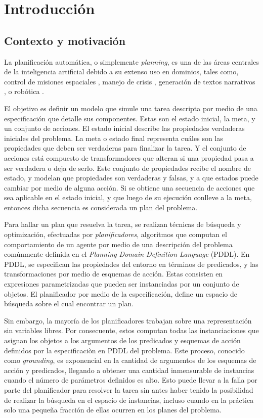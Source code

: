 \chapter{Introducción}
\label{ch:into}

\section{Contexto y motivación}
La planificación automática, o simplemente \emph{planning}, es una de las áreas
centrales de la inteligencia artificial debido a su extenso uso en dominios,
tales como, control de misiones espaciales \citep{RabideauG-et-al-2001}, manejo
de crisis \citep{Bienkowki-1995}, generación de textos narrativos
\citep{Goudoulakis-et-al-2016}, o robótica \citep{Munoz-et-al-2016}.

El objetivo es definir un modelo que simule una tarea descripta por medio de una
especificación que detalle sus componentes. Estas son el estado inicial, la
meta, y un conjunto de acciones. El estado inicial describe las propiedades
verdaderas iniciales del problema. La meta o estado final representa cuáles son
las propiedades que deben ser verdaderas para finalizar la tarea. Y el conjunto
de acciones está compuesto de transformadores que alteran si una propiedad pasa
a ser verdadera o deja de serlo. Este conjunto de propiedades recibe el nombre
de estado, y modelan que propiedades son verdaderas y falsas, y a que estados
puede cambiar por medio de alguna acción. Si se obtiene una secuencia de
acciones que sea aplicable en el estado inicial, y que luego de su ejecución
conlleve a la meta, entonces dicha secuencia es considerada un plan del
problema.

Para hallar un plan que resuelva la tarea, se realizan técnicas de búsqueda y
optimización, efectuadas por \emph{planificadores}, algoritmos que computan el
comportamiento de un agente por medio de una descripción del problema comúnmente
definida en el \emph{Planning Domain Definition Language} (PDDL). En PDDL, se
especifican las propiedades del entorno en términos de predicados, y las
transformaciones por medio de esquemas de acción. Estas consisten en expresiones
parametrizadas que pueden ser instanciadas por un conjunto de objetos. El
planificador por medio de la especificación, define un espacio de búsqueda sobre
el cual encontrar un plan.

Sin embargo, la mayoría de los planificadores trabajan sobre una representación
sin variables libres. Por consecuente, estos computan todas las instanciaciones
que asignan los objetos a los argumentos de los predicados y esquemas de acción
definidos por la especificaciòn en PDDL del problema. Este proceso, conocido
como \emph{grounding}, es exponencial en la cantidad de argumentos de los
esquemas de acción y predicados, llegando a obtener una cantidad inmensurable de
instancias cuando el número de parámetros definidos es alto. Esto puede llevar a
la falla por parte del planificador para resolver la tarea sin antes haber
tenido la posibilidad de realizar la búsqueda en el espacio de instancias,
incluso cuando en la práctica solo una pequeña fracción de ellas ocurren en los
planes del problema.
\citep{Gnad_Torralba_Dominguez_Areces_Bustos_2019}

